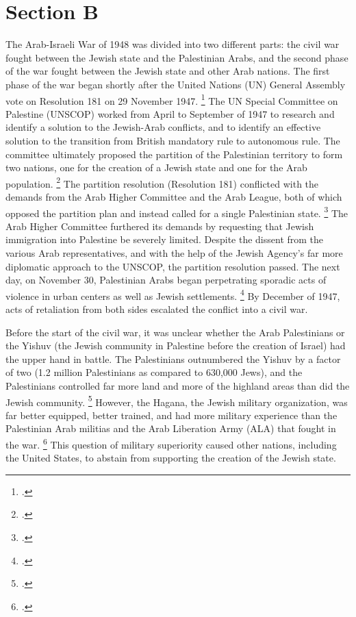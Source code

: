 \documentclass{turabian-researchpaper}
\begin{document}
\section{Section B}
The Arab-Israeli War of 1948 was divided into two different parts: the civil war fought between the Jewish state and the Palestinian Arabs, and the second phase of the war fought between the Jewish state and other Arab nations.  The first phase of the war began shortly after the United Nations (UN) General Assembly vote on Resolution 181 on 29 November 1947.
\footcite[][]{tal}
The UN Special Committee on Palestine (UNSCOP) worked from April to September of 1947 to research and identify a solution to the Jewish-Arab conflicts, and to identify an effective solution to the transition from British mandatory rule to autonomous rule.  The committee ultimately proposed the partition of the Palestinian territory to form two nations, one for the creation of a Jewish state and one for the Arab population.
\footcite[][22]{pappe}
The partition resolution (Resolution 181) conflicted with the demands from the Arab Higher Committee and the Arab League, both of which opposed the partition plan and instead called for a single Palestinian state.
\footcite[][23]{pappe}
The Arab Higher Committee furthered its demands by requesting that Jewish immigration into Palestine be severely limited.  Despite the dissent from the various Arab representatives, and with the help of the Jewish Agency's far more diplomatic approach to the UNSCOP, the partition resolution passed.  The next day, on November 30, Palestinian Arabs began perpetrating sporadic acts of violence in urban centers as well as Jewish settlements.
\footcite[][77]{morris}
By December of 1947, acts of retaliation from both sides escalated the conflict into a civil war.

Before the start of the civil war, it was unclear whether the Arab Palestinians or the Yishuv (the Jewish community in Palestine before the creation of Israel) had the upper hand in battle.  The Palestinians outnumbered the Yishuv by a factor of two (1.2 million Palestinians as compared to 630,000 Jews), and the Palestinians controlled far more land and more of the highland areas than did the Jewish community.
\footcite[][30]{bartal}
However, the Hagana, the Jewish military organization, was far better equipped, better trained, and had more military experience than the Palestinian Arab militias and the Arab Liberation Army (ALA) that fought in the war.
\footcite[][81]{morris}
This question of military superiority caused other nations, including the United States, to abstain from supporting the creation of the Jewish state.
\end{document}
